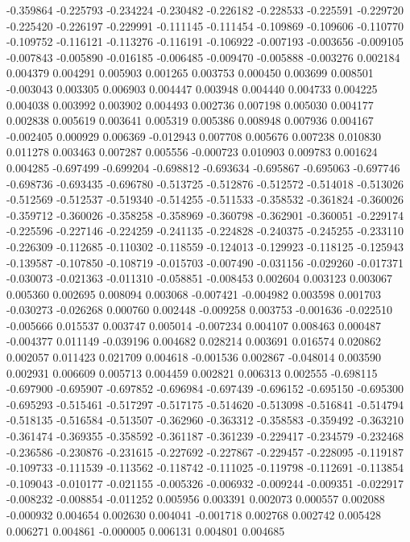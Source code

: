-0.359864
-0.225793
-0.234224
-0.230482
-0.226182
-0.228533
-0.225591
-0.229720
-0.225420
-0.226197
-0.229991
-0.111145
-0.111454
-0.109869
-0.109606
-0.110770
-0.109752
-0.116121
-0.113276
-0.116191
-0.106922
-0.007193
-0.003656
-0.009105
-0.007843
-0.005890
-0.016185
-0.006485
-0.009470
-0.005888
-0.003276
0.002184
0.004379
0.004291
0.005903
0.001265
0.003753
0.000450
0.003699
0.008501
-0.003043
0.003305
0.006903
0.004447
0.003948
0.004440
0.004733
0.004225
0.004038
0.003992
0.003902
0.004493
0.002736
0.007198
0.005030
0.004177
0.002838
0.005619
0.003641
0.005319
0.005386
0.008948
0.007936
0.004167
-0.002405
0.000929
0.006369
-0.012943
0.007708
0.005676
0.007238
0.010830
0.011278
0.003463
0.007287
0.005556
-0.000723
0.010903
0.009783
0.001624
0.004285
-0.697499
-0.699204
-0.698812
-0.693634
-0.695867
-0.695063
-0.697746
-0.698736
-0.693435
-0.696780
-0.513725
-0.512876
-0.512572
-0.514018
-0.513026
-0.512569
-0.512537
-0.519340
-0.514255
-0.511533
-0.358532
-0.361824
-0.360026
-0.359712
-0.360026
-0.358258
-0.358969
-0.360798
-0.362901
-0.360051
-0.229174
-0.225596
-0.227146
-0.224259
-0.241135
-0.224828
-0.240375
-0.245255
-0.233110
-0.226309
-0.112685
-0.110302
-0.118559
-0.124013
-0.129923
-0.118125
-0.125943
-0.139587
-0.107850
-0.108719
-0.015703
-0.007490
-0.031156
-0.029260
-0.017371
-0.030073
-0.021363
-0.011310
-0.058851
-0.008453
0.002604
0.003123
0.003067
0.005360
0.002695
0.008094
0.003068
-0.007421
-0.004982
0.003598
0.001703
-0.030273
-0.026268
0.000760
0.002448
-0.009258
0.003753
-0.001636
-0.022510
-0.005666
0.015537
0.003747
0.005014
-0.007234
0.004107
0.008463
0.000487
-0.004377
0.011149
-0.039196
0.004682
0.028214
0.003691
0.016574
0.020862
0.002057
0.011423
0.021709
0.004618
-0.001536
0.002867
-0.048014
0.003590
0.002931
0.006609
0.005713
0.004459
0.002821
0.006313
0.002555
-0.698115
-0.697900
-0.695907
-0.697852
-0.696984
-0.697439
-0.696152
-0.695150
-0.695300
-0.695293
-0.515461
-0.517297
-0.517175
-0.514620
-0.513098
-0.516841
-0.514794
-0.518135
-0.516584
-0.513507
-0.362960
-0.363312
-0.358583
-0.359492
-0.363210
-0.361474
-0.369355
-0.358592
-0.361187
-0.361239
-0.229417
-0.234579
-0.232468
-0.236586
-0.230876
-0.231615
-0.227692
-0.227867
-0.229457
-0.228095
-0.119187
-0.109733
-0.111539
-0.113562
-0.118742
-0.111025
-0.119798
-0.112691
-0.113854
-0.109043
-0.010177
-0.021155
-0.005326
-0.006932
-0.009244
-0.009351
-0.022917
-0.008232
-0.008854
-0.011252
0.005956
0.003391
0.002073
0.000557
0.002088
-0.000932
0.004654
0.002630
0.004041
-0.001718
0.002768
0.002742
0.005428
0.006271
0.004861
-0.000005
0.006131
0.004801
0.004685
